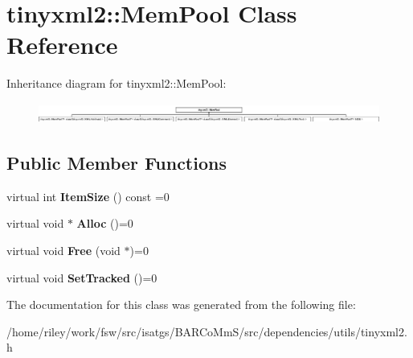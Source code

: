 \hypertarget{classtinyxml2_1_1_mem_pool}{}\section{tinyxml2\+:\+:Mem\+Pool Class Reference}
\label{classtinyxml2_1_1_mem_pool}
Inheritance diagram for tinyxml2\+:\+:Mem\+Pool\+:\begin{figure}[H]
\begin{center}
\leavevmode
\includegraphics[height=0.691358cm]{classtinyxml2_1_1_mem_pool}
\end{center}
\end{figure}
\subsection*{Public Member Functions}
\begin{DoxyCompactItemize}
\item 
virtual int {\bfseries Item\+Size} () const  =0\hypertarget{classtinyxml2_1_1_mem_pool_afb3d8c6cbe91b44f90043d0d94dc7306}{}\label{classtinyxml2_1_1_mem_pool_afb3d8c6cbe91b44f90043d0d94dc7306}

\item 
virtual void $\ast$ {\bfseries Alloc} ()=0\hypertarget{classtinyxml2_1_1_mem_pool_a4f977b5fed752c0bbfe5295f469d6449}{}\label{classtinyxml2_1_1_mem_pool_a4f977b5fed752c0bbfe5295f469d6449}

\item 
virtual void {\bfseries Free} (void $\ast$)=0\hypertarget{classtinyxml2_1_1_mem_pool_a49e3bfac2cba2ebd6776b31e571f64f7}{}\label{classtinyxml2_1_1_mem_pool_a49e3bfac2cba2ebd6776b31e571f64f7}

\item 
virtual void {\bfseries Set\+Tracked} ()=0\hypertarget{classtinyxml2_1_1_mem_pool_ac5804dd1387b2e4de5eef710076a0db1}{}\label{classtinyxml2_1_1_mem_pool_ac5804dd1387b2e4de5eef710076a0db1}

\end{DoxyCompactItemize}


The documentation for this class was generated from the following file\+:\begin{DoxyCompactItemize}
\item 
/home/riley/work/fsw/src/isatgs/\+B\+A\+R\+Co\+Mm\+S/src/dependencies/utils/tinyxml2.\+h\end{DoxyCompactItemize}
